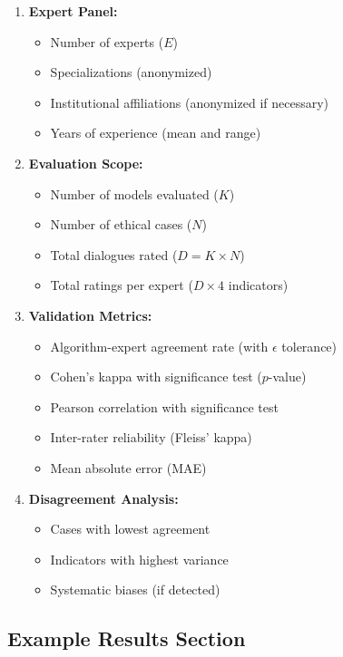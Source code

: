 \documentclass[11pt]{article}
\begin{document}
\begin{enumerate}[noitemsep]
    \item \textbf{Expert Panel:}
    \begin{itemize}[noitemsep]
        \item Number of experts ($E$)
        \item Specializations (anonymized)
        \item Institutional affiliations (anonymized if necessary)
        \item Years of experience (mean and range)
    \end{itemize}

    \item \textbf{Evaluation Scope:}
    \begin{itemize}[noitemsep]
        \item Number of models evaluated ($K$)
        \item Number of ethical cases ($N$)
        \item Total dialogues rated ($D = K \times N$)
        \item Total ratings per expert ($D \times 4$ indicators)
    \end{itemize}

    \item \textbf{Validation Metrics:}
    \begin{itemize}[noitemsep]
        \item Algorithm-expert agreement rate (with $\epsilon$ tolerance)
        \item Cohen's kappa with significance test ($p$-value)
        \item Pearson correlation with significance test
        \item Inter-rater reliability (Fleiss' kappa)
        \item Mean absolute error (MAE)
    \end{itemize}

    \item \textbf{Disagreement Analysis:}
    \begin{itemize}[noitemsep]
        \item Cases with lowest agreement
        \item Indicators with highest variance
        \item Systematic biases (if detected)
    \end{itemize}
\end{enumerate}

\subsection{Example Results Section}
\end{document}
